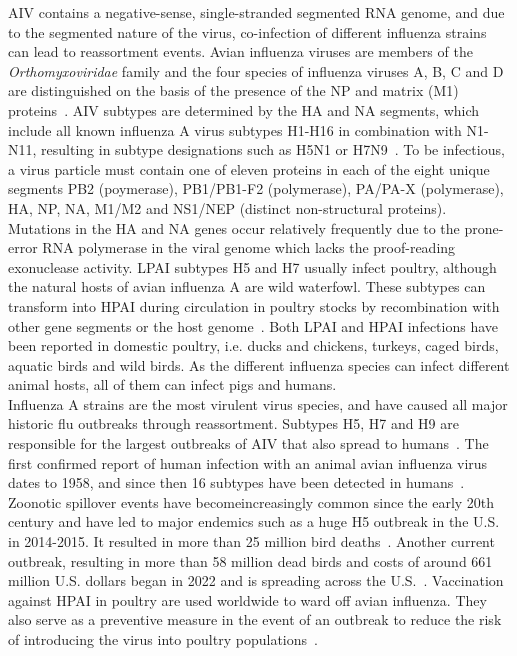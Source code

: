 \ac{AIV} contains a negative-sense, single-stranded segmented \ac{RNA} genome, and due to the segmented nature of the virus, co-infection of different influenza strains can lead to reassortment events. Avian influenza viruses are members of the \textit{Orthomyxoviridae} family and the four species of influenza viruses A, B, C and D are distinguished on the basis of the presence of the \ac{NP} and matrix (M1) proteins~\cite{webster1992evolution}. \ac{AIV} subtypes are determined by the \ac{HA} and \ac{NA} segments, which include all known influenza A virus subtypes H1-H16 in combination with N1-N11, resulting in subtype designations such as H5N1 or H7N9~\cite{webster1992evolution, krammer2018influenza}. To be infectious, a virus particle must contain one of eleven proteins in each of the eight unique segments PB2 (poymerase), PB1/PB1-F2 (polymerase), PA/PA-X (polymerase), \ac{HA}, \ac{NP}, \ac{NA}, M1/M2 and NS1/NEP (distinct non-structural proteins). Mutations in the \ac{HA} and \ac{NA} genes occur relatively frequently due to the prone-error \ac{RNA} polymerase in the viral genome which lacks the proof-reading exonuclease activity. \ac{LPAI} subtypes H5 and H7 usually infect poultry, although the natural hosts of avian influenza A are wild waterfowl. These subtypes can transform into \ac{HPAI} during circulation in poultry stocks by recombination with other gene segments or the host genome~\cite{webster2006h5n1}. Both \ac{LPAI} and \ac{HPAI} infections have been reported in domestic poultry, i.e. ducks and chickens, turkeys, caged birds, aquatic birds and wild birds. As the different influenza species can infect different animal hosts, all of them can infect pigs and humans. \\
Influenza A strains are the most virulent virus species, and have caused all major historic flu outbreaks through reassortment. Subtypes H5, H7 and H9 are responsible for the largest outbreaks of \ac{AIV} that also spread to humans~\cite{widdowson2017global}. The first confirmed report of human infection with an animal avian influenza virus dates to 1958, and since then 16 subtypes have been detected in humans~\cite{kluska1961demonstration}. Zoonotic spillover events have becomeincreasingly common since the early 20th century and have led to major endemics such as a huge H5 outbreak in the U.S. in 2014-2015. It resulted in more than 25 million bird deaths~\cite{seeger2021poultry}. Another current outbreak, resulting in more than 58 million dead birds and costs of around 661 million U.S. dollars began in 2022 and is spreading across the U.S.~\cite{usda2023hpai}. 
Vaccination against \ac{HPAI} in poultry are used worldwide to ward off avian influenza. They also serve as a preventive measure in the event of an outbreak to reduce the risk of introducing the virus into poultry populations~\cite{swayne2013current, swayne2011assessment}. 

